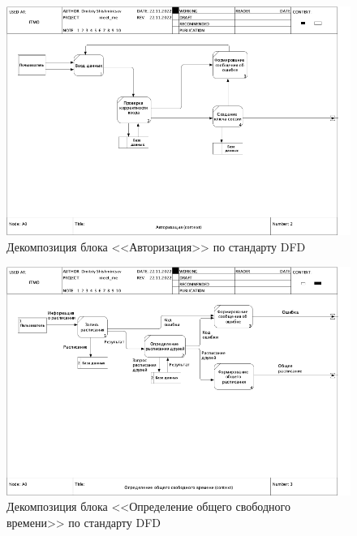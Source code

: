 \documentclass[14pt]{extreport}
\begin{document}
\begin{landscape}
            \begin{figure}[h]   
                \centering
                \includegraphics[width=0.9\linewidth]{img/DFD1.png}
                \caption{ Декомпозиция блока <<Авторизация>> по стандарту DFD}
                \label{fig:d3}
            \end{figure}

            \begin{figure}[h]   
                \centering
                \includegraphics[width=0.9\linewidth]{img/DFD2.png}
                \caption{ Декомпозиция блока <<Определение общего свободного времени>> по стандарту DFD}
                \label{fig:d4}
            \end{figure}
        \end{landscape}
\end{document}
